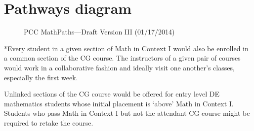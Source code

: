 \chapter{Pathways diagram}\label{app:sec:pathways}

\begin{figure}[!htb]
  \centering
  
  \caption{PCC MathPaths---Draft Version III (01/17/2014)}
  \label{app:figure:pathways}
\end{figure}

*Every student in a given section of Math in Context I 
would also be enrolled in a common section of the CG 
course.  The instructors of a given pair of courses 
would work in a collaborative fashion and ideally visit 
one another's classes, especially the first week. 

Unlinked sections of the CG course would be offered 
for entry level DE mathematics students whose initial 
placement is `above' Math in Context I.  Students who 
pass Math in Context I but not the attendant CG course 
might be required to retake the course. 

